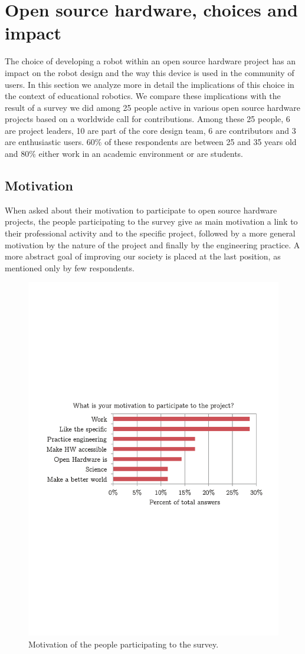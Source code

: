 \documentclass[letterpaper, 10 pt, conference]{ieeeconf}  %
\begin{document}
\section{Open source hardware, choices and impact}

The choice of developing a robot within an open source hardware project has an impact on the robot design and the way this device is used in the community of users. 
In this section we analyze more in detail the implications of this choice in the context of educational robotics.
We compare these implications with the result of a survey we did among 25 people active in various open source hardware projects based on a worldwide call for contributions. 
Among these 25 people, 6 are project leaders, 10 are part of the core design team, 6 are contributors and 3 are enthusiastic users.
60\% of these respondents are between 25 and 35 years old and 80\% either work in an academic environment or are students. 

\subsection{Motivation}

When asked about their motivation to participate to open source hardware projects, the people participating to the survey give as main motivation a link to their professional activity and to the specific project, followed by a more general motivation by the nature of the project and finally by the engineering practice. 
A more abstract goal of improving our society is placed at the last position, as mentioned only by few respondents.

\begin{figure}
\centering
\includegraphics[width=.7\columnwidth]{figures/motivation}
\caption{Motivation of the people participating to the survey.}
\label{fig:motivation}
\end{figure}
\end{document}
